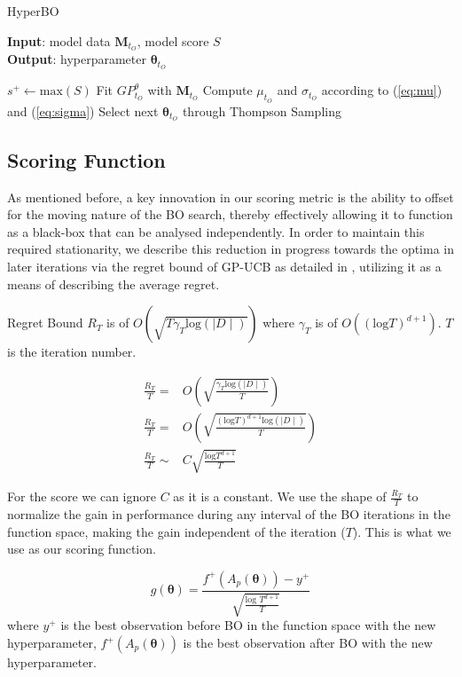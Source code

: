 \documentclass{article}
\begin{document}
\begin{algorithm}
	\caption{HyperBO}
	\label{alg:HyperBO}
	\textbf{Input}: model data $\boldsymbol{M}_{t_{O}}$, model score $S$\\
	\textbf{Output}: hyperparameter $\boldsymbol{\theta}_{t_{O}}$
	\begin{algorithmic}[1]
		\STATE $s^{+} \leftarrow \text{max}(S)$
		\STATE Fit $GP_{t_{O}}^{\theta}$ with $\boldsymbol{M}_{t_{O}}$
		\STATE Compute $\mu_{t_{O}}$ and $\sigma_{t_{O}}$ according to (\ref{eq:mu}) and (\ref{eq:sigma})
		\STATE Select next $\boldsymbol{\theta}_{t_{O}}$ through Thompson Sampling
	\end{algorithmic}
\end{algorithm}

\subsection{Scoring Function}

As mentioned before, a key innovation in our scoring metric is the ability to offset for the moving nature of the BO search, thereby effectively allowing it to function as a black-box that can be analysed independently. In order to maintain this required stationarity, we describe this reduction in progress towards the optima in later iterations via the regret bound of GP-UCB as detailed in \cite{Srinivas:2010:GPO:3104322.3104451}, utilizing it as a means of describing the average regret. 

Regret Bound $R_{T}$ is of $O(\sqrt{T\gamma_{T}\text{log}(\mid D \mid)})$ where $\gamma_{T}$ is of $O((\text{log} T)^{d+1})$. $T$ is the iteration number.

\begin{align*}
\frac{R_{T}}{T} = & O\left(\sqrt{\frac{\gamma_{T} \text{log}(\mid D \mid)}{T}} \right)\\
\frac{R_{T}}{T} = & O\left(\sqrt{\frac{(\text{log} T)^{d+1} \text{log}(\mid D \mid)}{T}} \right)\\
\frac{R_{T}}{T} \sim & C\sqrt{\frac{\text{log} T^{d+1}}{T}}
\end{align*}

For the score we can ignore $C$ as it is a constant. We use the shape of $\frac{R_{T}}{T}$ to normalize the gain in performance during any interval of the BO iterations in the function space, making the gain independent of the iteration ($T$). This is what we use as our scoring function.

\begin{equation}\label{eq:score1}
g(\boldsymbol{\theta}) = \frac{f^{+}(A_{p}(\boldsymbol{\theta}))-y^{+}}{\sqrt{\frac{\text{log } T^{d+1}}{T}}}
\end{equation}
where $y^{+}$ is the best observation before BO in the function space with the new hyperparameter, $f^{+}(A_{p}(\boldsymbol{\theta}))$ is the best observation after BO with the new hyperparameter.
\end{document}
